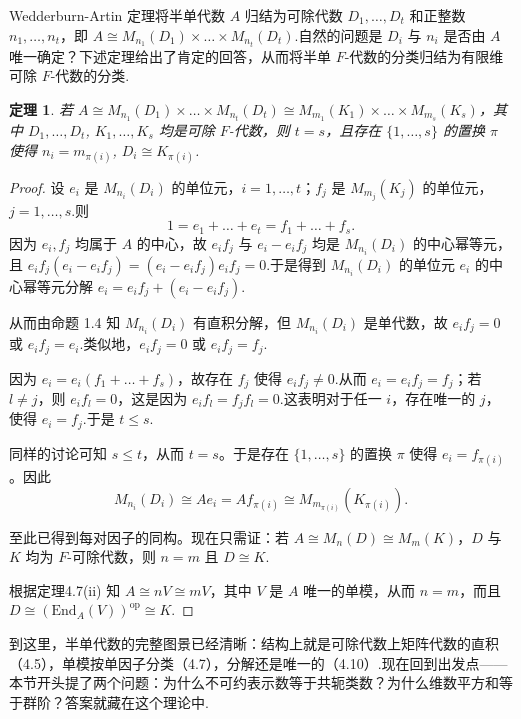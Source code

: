 \documentclass[11pt,a4paper]{article}
\theoremstyle{plain}
\newtheorem{thm}{定理}
\theoremstyle{definition}
\begin{document}
\noindent Wedderburn-Artin 定理将半单代数 $A$ 归结为可除代数 $D_1, \dots, D_t$ 和正整数 $n_1, \dots, n_t$，即 $A \cong M_{n_1}(D_1) \times \dots \times M_{n_t}(D_t)$.自然的问题是 $D_i$ 与 $n_i$ 是否由 $A$ 唯一确定？下述定理给出了肯定的回答，从而将半单 $F$-代数的分类归结为有限维可除 $F$-代数的分类.

\begin{thm}
若 $A \cong M_{n_1}(D_1) \times \dots \times M_{n_t}(D_t) \cong M_{m_1}(K_1) \times \dots \times M_{m_s}(K_s)$，其中 $D_1, \dots, D_t$, $K_1, \dots, K_s$ 均是可除 $F$-代数，则 $t = s$，且存在 $\{1, \dots, s\}$ 的置换 $\pi$ 使得 $n_i = m_{\pi(i)}$, $D_i \cong K_{\pi(i)}$.
\end{thm}

\begin{proof}
设 $e_i$ 是 $M_{n_i}(D_i)$ 的单位元，$i = 1, \dots, t$；$f_j$ 是 $M_{m_j}(K_j)$ 的单位元，$j = 1, \dots, s$.则
$$
1 = e_1 + \dots + e_t = f_1 + \dots + f_s.
$$
因为 $e_i, f_j$ 均属于 $A$ 的中心，故 $e_i f_j$ 与 $e_i - e_i f_j$ 均是 $M_{n_i}(D_i)$ 的中心幂等元，且 $e_i f_j (e_i - e_i f_j) = (e_i - e_i f_j) e_i f_j = 0$.于是得到 $M_{n_i}(D_i)$ 的单位元 $e_i$ 的中心幂等元分解 $e_i = e_i f_j + (e_i - e_i f_j)$.\par
从而由命题 1.4 知 $M_{n_i}(D_i)$ 有直积分解，但 $M_{n_i}(D_i)$ 是单代数，故 $e_i f_j = 0$ 或 $e_i f_j = e_i$.类似地，$e_i f_j = 0$ 或 $e_i f_j = f_j$.

因为 $e_i = e_i(f_1 + \dots + f_s)$，故存在 $f_j$ 使得 $e_i f_j \neq 0$.从而 $e_i = e_i f_j = f_j$；若 $l \neq j$，则 $e_i f_l = 0$，这是因为 $e_i f_l = f_j f_l = 0$.这表明对于任一 $i$，存在唯一的 $j$，使得 $e_i = f_j$.于是 $t \leq s$.

同样的讨论可知 $s \leq t$，从而 $t = s$。于是存在 $\{1, \dots, s\}$ 的置换 $\pi$ 使得 $e_i = f_{\pi(i)}$。因此
\[
M_{n_i}(D_i) \cong A e_i = A f_{\pi(i)} \cong M_{m_{\pi(i)}}(K_{\pi(i)}).
\]

至此已得到每对因子的同构。现在只需证：若 $A \cong M_n(D) \cong M_m(K)$，$D$ 与 $K$ 均为 $F$-可除代数，则 $n = m$ 且 $D \cong K$.

根据定理4.7(ii) 知 $A \cong nV \cong mV$，其中 $V$ 是 $A$ 唯一的单模，从而 $n = m$，而且 $D \cong (\mathrm{End}_A(V))^{\mathrm{op}} \cong K$.
\end{proof}



\noindent 到这里，半单代数的完整图景已经清晰：结构上就是可除代数上矩阵代数的直积（4.5），单模按单因子分类（4.7），分解还是唯一的（4.10）.现在回到出发点——本节开头提了两个问题：为什么不可约表示数等于共轭类数？为什么维数平方和等于群阶？答案就藏在这个理论中.
\end{document}
